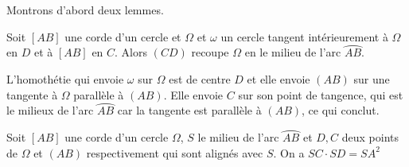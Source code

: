 \begin{sol}
Montrons d'abord deux lemmes.
\begin{center}
\end{center}

\begin{lemme}
Soit $\left[AB\right]$ une corde d'un cercle et $\Omega$ et $\omega$ un cercle tangent intérieurement à $\Omega$ en $D$ et à $\left[AB\right]$ en $C$. Alors $\left(CD\right)$ recoupe $\Omega$ en le milieu de l'arc $\wideparen{AB}$.
\end{lemme}
\begin{preuve}
L'homothétie qui envoie $\omega$ sur $\Omega$ est de centre $D$ et elle envoie $\left(AB\right)$ sur une tangente à $\Omega$ parallèle à $\left(AB\right)$. Elle envoie $C$ sur son point de tangence, qui est le milieux de l'arc $\wideparen{AB}$ car la tangente est parallèle à $\left(AB\right)$, ce qui conclut.
\end{preuve}

\begin{lemme}
Soit $\left[AB\right]$ une corde d'un cercle $\Omega$, $S$ le milieu de l'arc $\wideparen{AB}$ et $D,C$ deux points de $\Omega$ et $\left(AB\right)$ respectivement qui sont alignés avec $S$. On a $SC \cdot SD = SA^2$
\end{lemme}


\end{sol}

